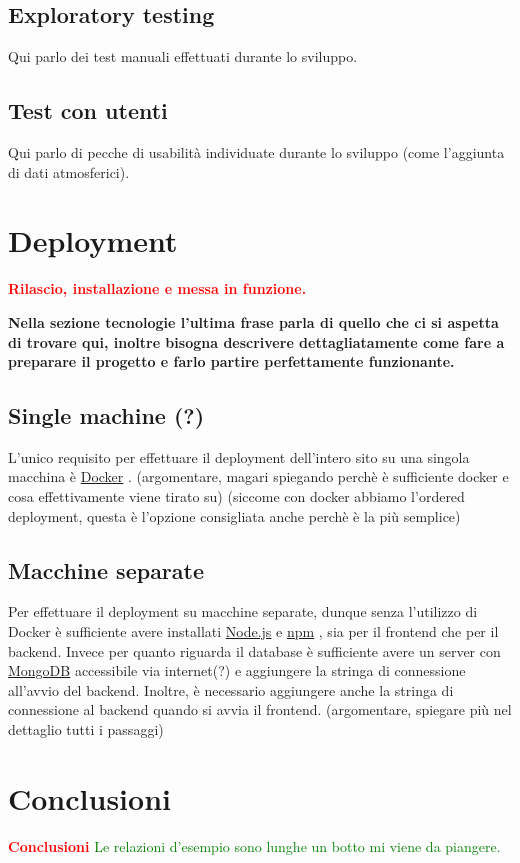 \documentclass{article}
\newcommand{\node}{\href{https://nodejs.org/it/}{Node.js} }
\newcommand{\npm}{\href{https://www.npmjs.com/}{npm} }
\newcommand{\mongodb}{\href{https://www.mongodb.com/it-it}{MongoDB} }
\newcommand{\docker}{\href{https://www.docker.com/}{Docker} }
\begin{document}
\subsection{Exploratory testing}
Qui parlo dei test manuali effettuati durante lo sviluppo.
\subsection{Test con utenti}
Qui parlo di pecche di usabilità individuate durante lo sviluppo (come l'aggiunta di dati atmosferici).

\section{Deployment}\label{sec:deployment}
\textcolor{red}{\textbf{Rilascio, installazione e messa in funzione.}}

\textbf{Nella sezione tecnologie l'ultima frase parla di quello che ci si aspetta di trovare qui, inoltre bisogna descrivere dettagliatamente come fare a preparare il progetto e farlo partire perfettamente funzionante.}

\subsection{Single machine (?)}
L'unico requisito per effettuare il deployment dell'intero sito su una singola macchina è \docker. (argomentare, magari spiegando perchè è sufficiente docker e cosa effettivamente viene tirato su)
(siccome con docker abbiamo l'ordered deployment, questa è l'opzione consigliata anche perchè è la più semplice)

\subsection{Macchine separate}
Per effettuare il deployment su macchine separate, dunque senza l'utilizzo di Docker è sufficiente avere installati \node e \npm, sia per il frontend che per il backend. Invece per quanto riguarda il database è sufficiente avere un server con \mongodb accessibile via internet(?) e aggiungere la stringa di connessione all'avvio del backend. Inoltre, è necessario aggiungere anche la stringa di connessione al backend quando si avvia il frontend.
(argomentare, spiegare più nel dettaglio tutti i passaggi)

\section{Conclusioni}
\textcolor{red}{\textbf{Conclusioni}}
\textcolor{green}{Le relazioni d'esempio sono lunghe un botto mi viene da piangere.}
\end{document}
